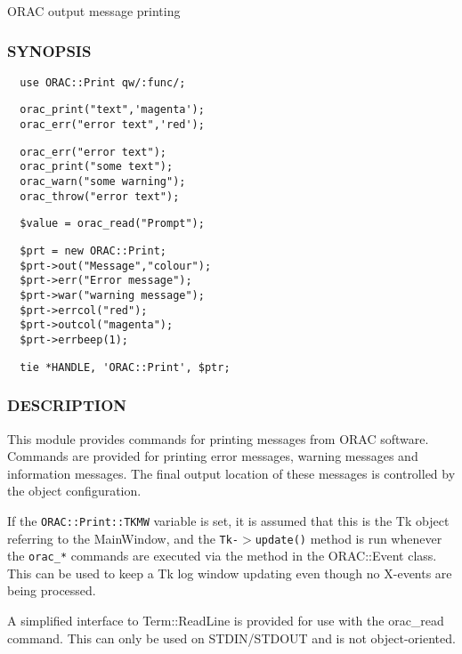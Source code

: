 ORAC output message printing

\subsubsection*{SYNOPSIS\label{ORAC::Print_SYNOPSIS}}
\begin{verbatim}
  use ORAC::Print qw/:func/;
\end{verbatim}
\begin{verbatim}
  orac_print("text",'magenta');
  orac_err("error text",'red');
\end{verbatim}
\begin{verbatim}
  orac_err("error text");
  orac_print("some text");
  orac_warn("some warning");
  orac_throw("error text");
\end{verbatim}
\begin{verbatim}
  $value = orac_read("Prompt");
\end{verbatim}
\begin{verbatim}
  $prt = new ORAC::Print;
  $prt->out("Message","colour");
  $prt->err("Error message"); 
  $prt->war("warning message");
  $prt->errcol("red");
  $prt->outcol("magenta");
  $prt->errbeep(1);
\end{verbatim}
\begin{verbatim}
  tie *HANDLE, 'ORAC::Print', $ptr;
\end{verbatim}
\subsubsection*{DESCRIPTION\label{ORAC::Print_DESCRIPTION}}


This module provides commands for printing messages from ORAC
software. Commands are provided for printing error messages, warning
messages and information messages. The final output location of these
messages is controlled by the object configuration.



If the \texttt{ORAC::Print::TKMW} variable is set, it is assumed that this
is the Tk object referring to the MainWindow, and the
\texttt{Tk-$>$update()} method is run whenever the \texttt{orac\_*} commands are
executed via the method in the ORAC::Event class.  This can be used to 
keep a Tk log window updating even though no X-events are being processed.



A simplified interface to Term::ReadLine is provided for use with
the orac\_read command. This can only be used on STDIN/STDOUT and
is not object-oriented.

